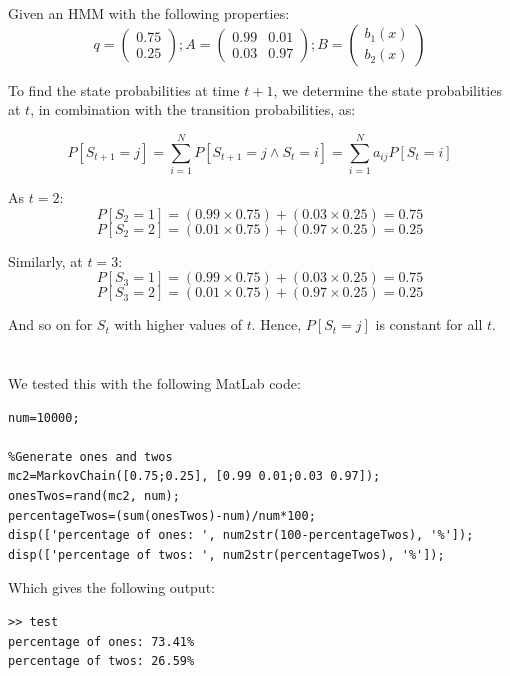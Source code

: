 \section{} %
Given an HMM with the following properties:
$$
q=
	\begin{pmatrix}
		0.75 \\
		0.25
	\end{pmatrix}
	;
A=
	\begin{pmatrix}
		0.99 &  0.01 \\
		0.03 & 0.97
	\end{pmatrix}
	;
B=
	\begin{pmatrix}
		b_1(x) \\
		b_2(x)
	\end{pmatrix}
$$

To find the state probabilities at time $t+1$, we determine the state probabilities at $t$, in combination with the transition probabilities, as:

$$
P[S_{t+1}=j] 
	= \sum_{i=1}^{N} P[S_{t+1} = j \land S_t = i]
	= \sum_{i=1}^{N} a_{i j} P[S_t = i]
$$

As $t=2$:
$$P[S_2 = 1] = (0.99 \times 0.75) + (0.03 \times 0.25) = 0.75$$
$$P[S_2 = 2] = (0.01 \times 0.75) + (0.97 \times 0.25) = 0.25$$

Similarly, at $t=3$:
$$P[S_3 = 1] = (0.99 \times 0.75) + (0.03 \times 0.25) = 0.75$$
$$P[S_3 = 2] = (0.01 \times 0.75) + (0.97 \times 0.25) = 0.25$$

And so on for $S_t$ with higher values of $t$. Hence, $P[S_t = j]$ is constant for all $t$.

\section{} %
We tested this with the following MatLab code:

\begin{verbatim}
num=10000;

%Generate ones and twos
mc2=MarkovChain([0.75;0.25], [0.99 0.01;0.03 0.97]);
onesTwos=rand(mc2, num);
percentageTwos=(sum(onesTwos)-num)/num*100;
disp(['percentage of ones: ', num2str(100-percentageTwos), '%']);
disp(['percentage of twos: ', num2str(percentageTwos), '%']);
\end{verbatim}

Which gives the following output:

\begin{verbatim}
>> test
percentage of ones: 73.41%
percentage of twos: 26.59%
\end{verbatim}

